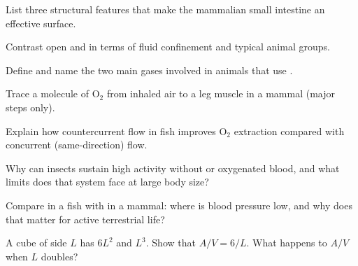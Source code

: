 \begin{exercise}[$\star$]\label{exo:g12:animal-exchange:2}
List three structural features that make the mammalian small intestine
an effective  surface.
\end{exercise}

\begin{exercise}[$\star$]\label{exo:g12:animal-exchange:3}
Contrast open and  in terms of fluid
confinement and typical animal groups.
\end{exercise}

\begin{exercise}[$\star$]\label{exo:g12:animal-exchange:4}
Define  and name the two main gases involved in animals
that use .
\end{exercise}

\begin{exercise}[$\star\star$]\label{exo:g12:animal-exchange:5}
Trace a molecule of O$_2$ from inhaled air to a leg muscle 
in a mammal (major steps only).
\end{exercise}

\begin{exercise}[$\star\star$]\label{exo:g12:animal-exchange:6}
Explain how countercurrent flow in fish  improves O$_2$ extraction
compared with concurrent (same-direction) flow.
\end{exercise}

\begin{exercise}[$\star\star$]\label{exo:g12:animal-exchange:7}
Why can insects sustain high activity without  or oxygenated
blood, and what limits does that system face at large body size?
\end{exercise}

\begin{exercise}[$\star\star$]\label{exo:g12:animal-exchange:8}
Compare  in a fish with  in a
mammal: where is blood pressure low, and why does that matter for
active terrestrial life?
\end{exercise}

\begin{exercise}[$\star\star$]\label{exo:g12:animal-exchange:9}
A cube of side $L$ has  $6L^2$ and  $L^3$. Show that
$A/V = 6/L$. What happens to $A/V$ when $L$ doubles?
\end{exercise}

